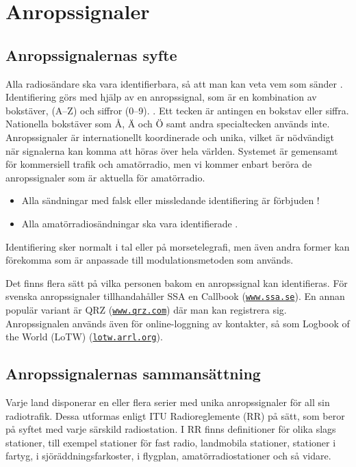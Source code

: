 \section{Anropssignaler}
\label{anropssignaler}

\subsection{Anropssignalernas syfte}

Alla radiosändare ska vara identifierbara, så att man kan veta vem
som sänder \cite[\S19.1]{ITU-RR}.
Identifiering görs med hjälp av en anropssignal, som är en kombination av
bokstäver, (A--Z) och siffror (0--9). \cite[\S19.45]{ITU-RR}.
Ett tecken är antingen en bokstav eller siffra.
Nationella bokstäver som Å, Ä och Ö samt andra specialtecken används inte.
Anropssignaler är internationellt koordinerade och unika, vilket är nödvändigt
när signalerna kan komma att höras över hela världen.
Systemet är gemensamt för kommersiell trafik och amatörradio, men vi kommer
enbart beröra de anropssignaler som är aktuella för amatörradio.

\begin{itemize}
\item Alla sändningar med falsk eller missledande identifiering är förbjuden
\cite[\S19.2]{ITU-RR}!

\item Alla amatörradiosändningar ska vara identifierade \cite[\S19.4, \S19.5]{ITU-RR}.
\end{itemize}

Identifiering sker normalt i tal eller på morsetelegrafi, men även andra former
kan förekomma som är anpassade till modulationsmetoden som används.

Det finns flera sätt på vilka personen bakom en anropssignal kan identifieras.
För svenska anropssignaler tillhandahåller SSA en Callbook
(\href{http://www.ssa.se/}{\texttt{www.ssa.se}}).
En annan populär variant är QRZ (\href{https://www.qrz.com/}{\texttt{www.qrz.com}}) där
man kan registrera sig.
Anropssignalen används även för online-loggning av kontakter, så som
Logbook of the World (LoTW) (\href{https://lotw.arrl.org/}{\texttt{lotw.arrl.org}}).

\subsection{Anropssignalernas sammansättning}

Varje land disponerar en eller flera serier med unika anropssignaler för all
sin radiotrafik.
Dessa utformas enligt ITU Radioreglemente (RR) \cite[\S19]{ITU-RR} på sätt,
som beror på syftet med varje särskild radiostation.
I RR finns definitioner för olika slags stationer, till exempel stationer för fast
radio, landmobila stationer, stationer i fartyg, i sjöräddningsfarkoster,
i flygplan, amatörradiostationer och så vidare.

